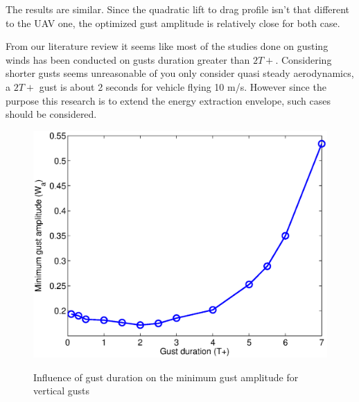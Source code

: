 \par The results are similar.
Since the quadratic lift to drag profile isn't that different to the UAV one, the optimized gust amplitude is relatively close for both case.

\FloatBarrier

%



From our literature review it seems like most of the studies done on gusting winds has been conducted on gusts duration greater than $2T+$.
Considering shorter gusts seems unreasonable of you only consider quasi steady aerodynamics, a $2T+$ gust is about 2 seconds for vehicle flying 10 m/s.
However since the purpose this research is to extend the energy extraction envelope, such cases should be considered.

\begin{figure}[h!]
  \begin{center}
    \scalebox{0.8}
    {\includegraphics{./Figures/Vertical_gust_amplitude_vs_duration.eps}}
  \end{center}
  \caption{Influence of gust duration on the minimum gust amplitude for vertical gusts}
  \label{fig:vertical_amplitude_duration}
\end{figure}

